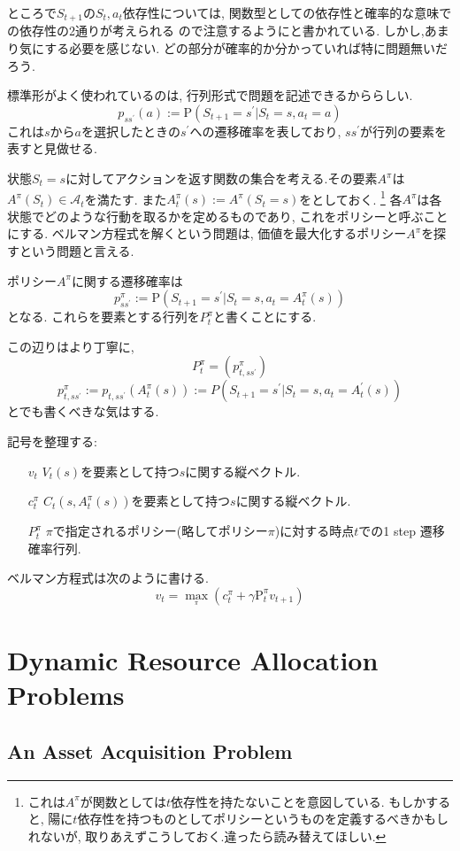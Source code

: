 \documentclass[11pt]{jsbook}
\begin{document}
ところで$S_{t+1}$の$S_t, a_t$依存性については, 関数型としての依存性と確率的な意味での依存性の2通りが考えられる
ので注意するようにと書かれている. しかし,あまり気にする必要を感じない.
どの部分が確率的か分かっていれば特に問題無いだろう.

標準形がよく使われているのは, 行列形式で問題を記述できるかららしい.
\[ p_{ss^\prime}(a) := \mathrm{P}(S_{t+1} = s^\prime | S_t = s, a_t = a) \]
これは$s$から$a$を選択したときの$s^\prime$への遷移確率を表しており,
$ss^\prime$が行列の要素を表すと見做せる.

状態$S_t=s$に対してアクションを返す関数の集合を考える.その要素$A^\pi$は
$A^\pi (S_t) \in \mathcal{A}_t $を満たす.
また$A_t^\pi (s) := A^\pi (S_t=s)$をとしておく.
\footnote{これは$A^\pi$が関数としては$t$依存性を持たないことを意図している.
もしかすると, 陽に$t$依存性を持つものとしてポリシーというものを定義するべきかもしれないが,
取りあえずこうしておく.違ったら読み替えてほしい.}
各$A^\pi$は各状態でどのような行動を取るかを定めるものであり, これをポリシーと呼ぶことにする.
ベルマン方程式を解くという問題は, 価値を最大化するポリシー$A^\pi$を探すという問題と言える.

ポリシー$A^\pi$に関する遷移確率は
\[ p_{ss^\prime}^\pi := \mathrm{P}(S_{t+1} = s^\prime | S_t = s, a_t = A_t^\pi(s)) \]
となる. これらを要素とする行列を$P_t^\pi$と書くことにする.

この辺りはより丁寧に, 
\[ P_t^\pi = (p_{t,ss^\prime}^\pi) \]
\[ p_{t,ss^\prime}^\pi := p_{t,ss^\prime}(A_t^\pi(s)) := P(S_{t+1}=s^\prime | S_t = s, a_t = A_t^\prime(s))\]
 とでも書くべきな気はする.

記号を整理する:
\begin{enumerate}
	\item[$v_t$] $V_t(s)$を要素として持つ$s$に関する縦ベクトル.
	\item[$c_t^\pi$] $C_t(s,A_t^\pi(s))$を要素として持つ$s$に関する縦ベクトル.
	\item[$P_t^\pi$] $\pi$で指定されるポリシー(略してポリシー$\pi$)に対する時点$t$での1 step 遷移確率行列.
\end{enumerate}

ベルマン方程式は次のように書ける.
\begin{equation}
	v_t = \max_{^\pi} \left( c_t^\pi + \gamma \mathrm{P}_t^\pi v_{t+1} \right)
\end{equation}

\chapter{Dynamic Resource Allocation Problems}
\section{An Asset Acquisition Problem}
\end{document}
